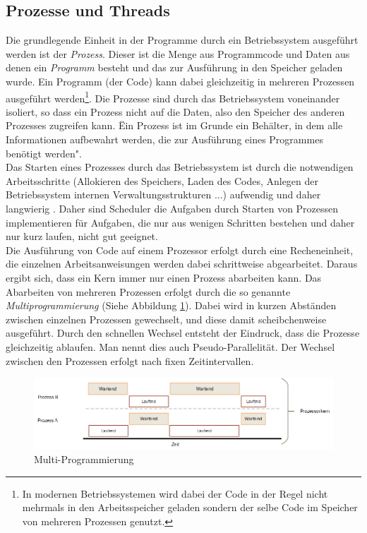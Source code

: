 \subsection{Prozesse und Threads}
Die grundlegende Einheit in der Programme durch ein Betriebssystem ausgeführt werden ist der \emph{Prozess}. Dieser ist die Menge aus Programmcode und Daten aus denen ein \emph{Programm} besteht und das zur Ausführung in den Speicher geladen wurde. Ein Programm (der Code) kann dabei gleichzeitig in mehreren Prozessen ausgeführt werden\footnote{In modernen Betriebssystemen wird dabei der Code in der Regel nicht mehrmals in den Arbeitsspeicher geladen sondern der selbe Code im Speicher von mehreren Prozessen genutzt.}. Die Prozesse sind durch das Betriebssystem voneinander isoliert, so dass ein Prozess nicht auf die Daten, also den Speicher des anderen Prozesses zugreifen kann.\parencite[S. 71ff]{tanenbaum2016} \"Ein Prozess ist im Grunde ein Behälter, in dem alle Informationen aufbewahrt werden, die zur Ausführung eines Programmes benötigt werden"\parencite[S. 71]{tanenbaum2016}.
\\Das Starten eines Prozesses durch das Betriebssystem ist durch die notwendigen Arbeitsschritte (Allokieren des Speichers, Laden des Codes, Anlegen der Betriebssystem internen Verwaltungsstrukturen ...) aufwendig und daher langwierig \parencite[S.1091ff]{tanenbaum2016}. Daher sind Scheduler die Aufgaben durch Starten von Prozessen implementieren für Aufgaben, die nur aus wenigen Schritten bestehen und daher nur kurz laufen, nicht gut geeignet.
\\Die Ausführung von Code auf einem Prozessor erfolgt durch eine Recheneinheit, die einzelnen Arbeitsanweisungen werden dabei schrittweise abgearbeitet. Daraus ergibt sich, dass ein Kern immer nur einen Prozess abarbeiten kann. Das Abarbeiten von mehreren Prozessen erfolgt durch die so genannte \emph{Multiprogrammierung} (Siehe Abbildung \ref{fig:time_slice}). Dabei wird in kurzen Abständen zwischen einzelnen Prozessen gewechselt, und diese damit scheibchenweise ausgeführt. Durch den schnellen Wechsel entsteht der Eindruck, dass die Prozesse gleichzeitig ablaufen. Man nennt dies auch Pseudo-Parallelität.\parencite[S. 127ff]{tanenbaum2016} Der Wechsel zwischen den Prozessen erfolgt nach fixen Zeitintervallen.

\begin{figure}
	\centering
	\includegraphics[width=0.7\linewidth]{images/time_slice}
	\caption{Multi-Programmierung\parencite[S. 128]{tanenbaum2016}}
	\label{fig:time_slice}
\end{figure}

